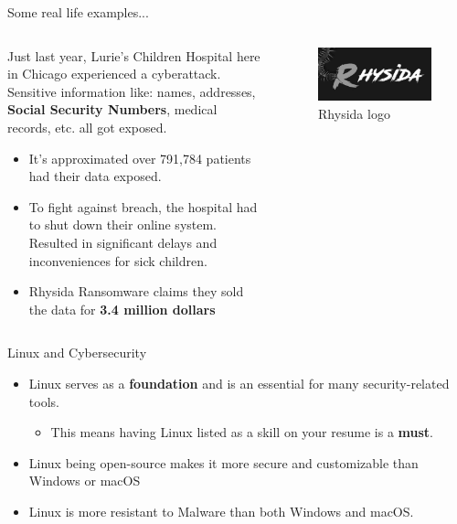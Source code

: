 \documentclass{beamer}
\begin{document}
\begin{frame}{Some real life examples...}
	\begin{columns}
		\begin{column}{0.5\textwidth}
			Just last year, Lurie's Children Hospital here in Chicago experienced a cyberattack. Sensitive information like: names, addresses, \textbf{Social Security Numbers}, medical records, etc. all got exposed.
			\pause
			\begin{itemize}
				\item It's approximated over 791,784 patients had their data exposed. 
				\pause
				\item To fight against breach, the hospital had to shut down their online system. Resulted in significant delays and inconveniences for sick children.
				\pause
				\item Rhysida Ransomware claims they sold the data for \textbf{3.4 million dollars}
				
			\end{itemize}
		\end{column}
		\begin{column}{0.5\textwidth}
			\begin{figure}
				\centering
				\includegraphics[width=0.7\linewidth]{rhysida.jpeg}
				\caption{Rhysida logo}
				\label{fig:rhysida}
			\end{figure}
		\end{column}
	\end{columns}
\end{frame}

\begin{frame}{Linux and Cybersecurity}
	\begin{itemize}
		\item Linux serves as a \textbf{foundation} and is an essential for many security-related tools.
		\begin{itemize}
			\item This means having Linux listed as a skill on your resume is a \textbf{must}.
		\end{itemize}
		\pause
		\item Linux being open-source makes it more secure and customizable than Windows or macOS
		\pause
		\item Linux is more resistant to Malware than both Windows and macOS.
	\end{itemize}
\end{frame}
\end{document}
